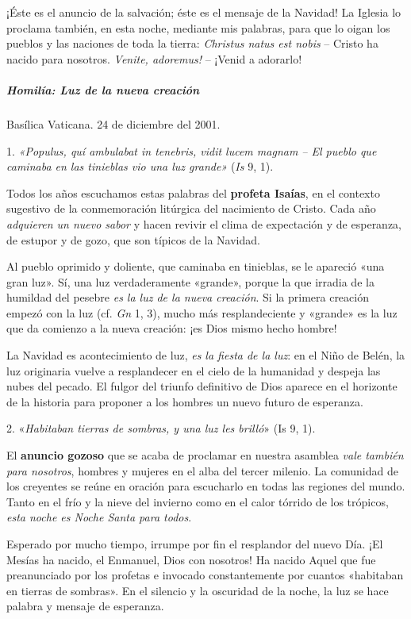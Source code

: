 \documentclass[]{article}
\let\oldsubparagraph\subparagraph
\renewcommand{\subparagraph}[1]{\oldsubparagraph{#1}\mbox{}}
\begin{document}
¡Éste es el anuncio de la salvación; éste es el mensaje de la Navidad!
La Iglesia lo proclama también, en esta noche, mediante mis palabras,
para que lo oigan los pueblos y las naciones de toda la tierra:
\emph{Christus natus est nobis} -- Cristo ha nacido para nosotros.
\emph{Venite, adoremus!} -- ¡Venid a adorarlo!

\subparagraph{Homilía: Luz de la nueva
creación}\label{homiluxeda-luz-de-la-nueva-creaciuxf3n}

Basílica Vaticana. 24 de diciembre del 2001.

1. \emph{«Populus, quí ambulabat in tenebris, vidit lucem magnam -- El
pueblo que caminaba en las tinieblas vio una luz grande»} (\emph{Is} 9,
1).

Todos los años escuchamos estas palabras del \textbf{profeta Isaías}, en
el contexto sugestivo de la conmemoración litúrgica del nacimiento de
Cristo. Cada año \emph{adquieren un nuevo sabor} y hacen revivir el
clima de expectación y de esperanza, de estupor y de gozo, que son
típicos de la Navidad.

Al pueblo oprimido y doliente, que caminaba en tinieblas, se le apareció
«una gran luz». Sí, una luz verdaderamente «grande», porque la que
irradia de la humildad del pesebre \emph{es la luz de la nueva
creación}. Si la primera creación empezó con la luz (cf. \emph{Gn} 1,
3), mucho más resplandeciente y «grande» es la luz que da comienzo a la
nueva creación: ¡es Dios mismo hecho hombre!

La Navidad es acontecimiento de luz, \emph{es la fiesta de la luz}: en
el Niño de Belén, la luz originaria vuelve a resplandecer en el cielo de
la humanidad y despeja las nubes del pecado. El fulgor del triunfo
definitivo de Dios aparece en el horizonte de la historia para proponer
a los hombres un nuevo futuro de esperanza.

2. «\emph{Habitaban tierras de sombras, y una luz les brilló}» (Is 9,
1).

El \textbf{anuncio gozoso} que se acaba de proclamar en nuestra asamblea
\emph{vale también para nosotros}, hombres y mujeres en el alba del
tercer milenio. La comunidad de los creyentes se reúne en oración para
escucharlo en todas las regiones del mundo. Tanto en el frío y la nieve
del invierno como en el calor tórrido de los trópicos, \emph{esta noche
es Noche Santa para todos}.

Esperado por mucho tiempo, irrumpe por fin el resplandor del nuevo Día.
¡El Mesías ha nacido, el Enmanuel, Dios con nosotros! Ha nacido Aquel
que fue preanunciado por los profetas e invocado constantemente por
cuantos «habitaban en tierras de sombras». En el silencio y la oscuridad
de la noche, la luz se hace palabra y mensaje de esperanza.
\end{document}

